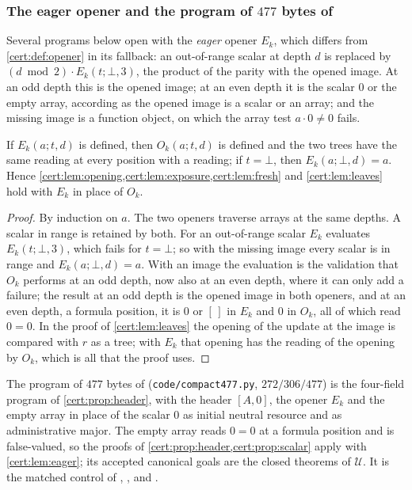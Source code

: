 \subsubsection*{The eager opener and the program of $477$ bytes of }

Several programs below open with the \emph{eager} opener $E_k$, which differs
from \cref{cert:def:opener} in its fallback: an out-of-range scalar at depth
$d$ is replaced by $(d\bmod 2)\cdot E_k(t;\bot,3)$, the product of the parity
with the opened image. At an odd depth this is the opened image; at an even
depth it is the scalar $0$ or the empty array, according as the opened image
is a scalar or an array; and the missing image is a function object, on which
the array test $a\cdot 0\neq 0$ fails.

\begin{lemma}\label{cert:lem:eager}
If $E_k(a;t,d)$ is defined, then $O_k(a;t,d)$ is defined and the two trees
have the same reading at every position with a reading; if $t=\bot$, then
$E_k(a;\bot,d)=a$. Hence \cref{cert:lem:opening,cert:lem:exposure,cert:lem:fresh}
and \cref{cert:lem:leaves} hold with $E_k$ in place of $O_k$.
\end{lemma}
\begin{proof}
By induction on $a$. The two openers traverse arrays at the same depths. A
scalar in range is retained by both. For an out-of-range scalar $E_k$
evaluates $E_k(t;\bot,3)$, which fails for $t=\bot$; so with the missing
image every scalar is in range and $E_k(a;\bot,d)=a$. With an image the
evaluation is the validation that $O_k$ performs at an odd depth, now also at
an even depth, where it can only add a failure; the result at an odd depth is
the opened image in both openers, and at an even depth, a formula position,
it is $0$ or $[\,]$ in $E_k$ and $0$ in $O_k$, all of which read $0=0$. In the
proof of \cref{cert:lem:leaves} the opening of the update at the image is
compared with $r$ as a tree; with $E_k$ that opening has the reading of the
opening by $O_k$, which is all that the proof uses.
\end{proof}

The program of $477$ bytes of 
(\texttt{code/compact477.py}, $272/306/477$) is the four-field program of
\cref{cert:prop:header}, with the header $[A,0]$, the opener $E_k$ and the
empty array in place of the scalar $0$ as initial neutral resource and as
administrative major. The empty array reads $0=0$ at a formula position and
is false-valued, so the proofs of \cref{cert:prop:header,cert:prop:scalar}
apply with \cref{cert:lem:eager}; its accepted canonical goals are the closed
theorems of $\mathcal U$. It is the matched control of
, ,
 and .

